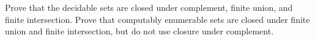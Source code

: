 \begin{exercise}
\label{ex:turing-machines-01}
Prove that the decidable sets are closed under complement, finite union, and
finite intersection.  Prove that computably enumerable sets are closed under
finite union and finite intersection, but do not use closure under complement.
\end{exercise}

